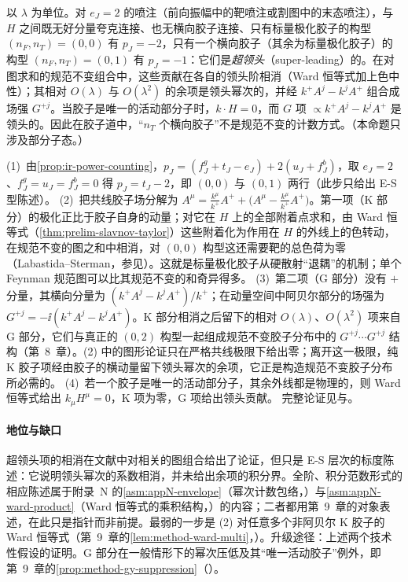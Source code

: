 \begin{proposition}\label{prop:ir-super-leading}
以 $\lambda$ 为单位。对 $e_J=2$ 的喷注（前向振幅中的靶喷注或割图中的末态喷注），与 $H$ 之间既无好分量夸克连接、也无横向胶子连接、只有标量极化胶子的构型 $(n_F,n_T)=(0,0)$ 有 $p_J=-2$，只有一个横向胶子（其余为标量极化胶子）的构型 $(n_F,n_T)=(0,1)$ 有 $p_J=-1$：它们是\emph{超领头}（super-leading）的。在对图求和的规范不变组合中，这些贡献在各自的领头阶相消（Ward 恒等式加上色中性）；其相对 $O(\lambda)$ 与 $O(\lambda^2)$ 的余项是领头幂次的，并经 $k^+A^j-k^jA^+$ 组合成场强 $G^{+j}$。当胶子是唯一的活动部分子时，$k\cdot H=0$，而 $G$ 项 $\propto k^+A^j-k^jA^+$ 是领头的。因此在胶子道中，“$n_T$ 个横向胶子”不是规范不变的计数方式。（本命题只涉及部分子态。）
\end{proposition}
\begin{proofsketch}
(1)~由\cref{prop:ir-power-counting}，$p_J=(f^g_J+t_J-e_J)+2(u_J+f^b_J)$，取 $e_J=2$、$f^g_J=u_J=f^b_J=0$ 得 $p_J=t_J-2$，即 $(0,0)$ 与 $(0,1)$ 两行（此步只给出 E-S 型陈述）。
(2)~把共线胶子场分解为 $A^\mu=\frac{k^\mu}{k^+}A^++\big(A^\mu-\frac{k^\mu}{k^+}A^+\big)$。第一项（K 部分）的极化正比于胶子自身的动量；对它在 $H$ 上的全部附着点求和，由 Ward 恒等式（\cref{thm:prelim-slavnov-taylor}）这些附着化为作用在 $H$ 的外线上的色转动，在规范不变的图之和中相消，对 $(0,0)$ 构型这还需要靶的总色荷为零（Labastida--Sterman\cite{Labastida:1984gy}，参见\cite[第~5.8.8~节]{Collins2011}）。这就是标量极化胶子从硬散射“退耦”的机制\cite[第~2.4~节]{Sterman:1995fz}；单个 Feynman 规范图可以比其规范不变的和奇异得多\cite[第~8.6~节]{CollinsSoperSterman1989}。
(3)~第二项（G 部分）没有 $+$ 分量，其横向分量为 $(k^+A^j-k^jA^+)/k^+$；在动量空间中阿贝尔部分的场强为 $G^{+j}=-\ii(k^+A^j-k^jA^+)$。K 部分相消之后留下的相对 $O(\lambda)$、$O(\lambda^2)$ 项来自 G 部分，它们与真正的 $(0,2)$ 构型一起组成规范不变胶子分布中的 $G^{+j}\cdots G^{+j}$ 结构（第~8~章）。(2) 中的图形论证只在严格共线极限下给出零；离开这一极限，纯 K 胶子项经由胶子的横动量留下领头幂次的余项，它正是构造规范不变胶子分布所必需的\cite{Collins:2008sg}。
(4)~若一个胶子是唯一的活动部分子，其余外线都是物理的，则 Ward 恒等式给出 $k_\mu H^\mu=0$，K 项为零，G 项给出领头贡献。
完整论证见\cite[第~8.6~节]{CollinsSoperSterman1989}与\cite[第~5.8.8、5.9.1~节]{Collins2011}。
\end{proofsketch}

\paragraph{地位与缺口}
超领头项的相消在文献中对相关的图组合给出了论证，但只是 E-S 层次的标度陈述：它说明领头幂次的系数相消，并未给出余项的积分界。全阶、积分范数形式的相应陈述属于附录~N 的\cref{asm:appN-envelope}（幂次计数包络，\tagA）与\cref{asm:appN-ward-product}（Ward 恒等式的乘积结构，\tagA）的内容；二者都用第~9~章的对象表述，在此只是指针而非前提。最弱的一步是 (2) 对任意多个非阿贝尔 K 胶子的 Ward 恒等式（第~9~章的\cref{lem:method-ward-multi}，\tagA）。升级途径：上述两个技术性假设的证明。G 部分在一般情形下的幂次压低及其“唯一活动胶子”例外，即第~9~章的\cref{prop:method-gy-suppression}（\tagA）。

